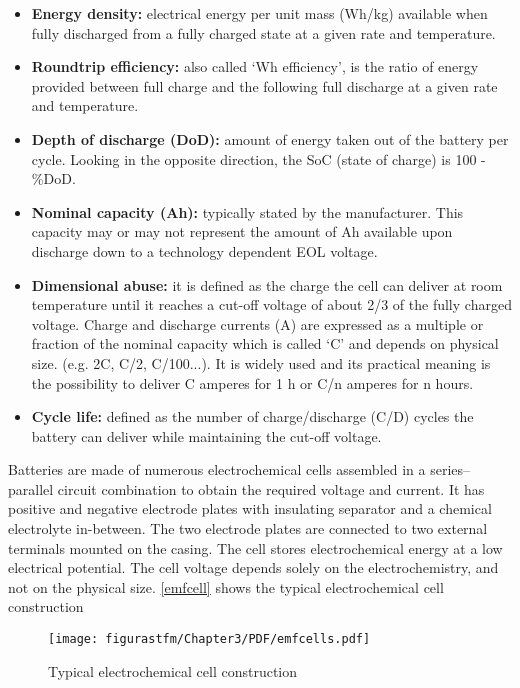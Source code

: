 \begin{itemize}

	\item \textbf{Energy density:} electrical energy per unit mass (Wh/kg) available when fully
discharged from a fully charged state at a given rate and temperature.
	\item \textbf{Roundtrip efficiency:} also called `Wh efficiency', is the ratio of energy provided between full charge and the following full discharge at a given rate and temperature.
	\item \textbf{Depth of discharge (\acrshort{DoD}):} amount of energy taken out of the battery per cycle. Looking in the opposite direction, the \acrshort{SoC} (state of charge) is 100 - \%\acrshort{DoD}.
	\item \textbf{Nominal capacity (Ah):} typically stated by the manufacturer. This capacity may or may not represent the amount of Ah available upon discharge down to a technology dependent \acrshort{EOL} voltage. 
	\item \textbf{Dimensional abuse:} it is defined as the charge the cell can deliver at room temperature until it reaches a cut-off voltage of about 2/3 of the fully charged voltage. Charge and discharge currents (A) are expressed as a multiple or fraction of the nominal capacity which is called `C' and depends on physical size. (e.g. 2C, C/2, C/100...). It is widely used and its practical meaning is the possibility to deliver C amperes for 1 h or C/n amperes for n hours.
	\item \textbf{Cycle life:} defined as the number of charge/discharge (C/D) cycles the
battery can deliver while maintaining the cut-off voltage.
	

\end{itemize}

Batteries are made of numerous electrochemical cells assembled in a series–parallel circuit combination to obtain the required voltage and current. It has positive and negative electrode plates with insulating separator and a chemical electrolyte in-between. The two electrode plates
are connected to two external terminals mounted on the casing. The cell stores electrochemical energy at a low electrical potential. The cell voltage depends solely on the electrochemistry, and not on the physical size. \autoref{emfcell} shows the typical electrochemical cell construction \cite{spacecraftspower}
			\begin{figure} [H] 				
				\centering
				\texttt{[image: figurastfm/Chapter3/PDF/emfcells.pdf]}
				\caption{Typical electrochemical cell construction \cite{spacecraftspower}} \label{emfcell}
				\vspace{-0.5cm}
			\end{figure}

